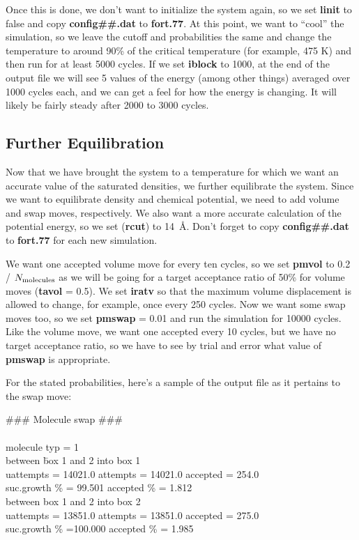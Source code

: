 \documentclass[12pt,letterpaper]{article}
\begin{document}
{{{{{{\noindent Once this is done, we don't want to initialize the system again, so we set
{\bf linit} to false and copy {\bf config\#\#.dat} to {\bf fort.77}.  At
this point, we want to ``cool'' the simulation, so we leave the cutoff
and probabilities the same and change the temperature to around 90\%
of the critical temperature (for example, 475 K) and then run for at least
5000 cycles.  If we set {\bf iblock} to 1000, at the end of the
output file we will see 5 values of the energy (among other things)
averaged over 1000 cycles each, and we can get a feel for how the energy is
changing.  It will likely be fairly steady after 2000 to 3000 cycles.

\subsection{Further Equilibration}

\noindent Now that we have brought the system to a temperature for which
we want an accurate value of the saturated densities, we further equilibrate the system.
Since we want to equilibrate density and chemical potential, we need to add volume and swap moves, respectively.  We also want a more accurate
calculation of the potential energy, so we set ({\bf rcut}) to
14~{\AA}.  Don't forget to copy {\bf config\#\#.dat} to {\bf fort.77} for each
new simulation.

\noindent We want one accepted volume move for every ten
cycles, so we set {\bf pmvol} to 0.2 / $N_{\rm molecules}$ as
we will be going for a target acceptance ratio of 50\% for volume
moves ({\bf tavol} = 0.5).  We set {\bf iratv} so that the maximum volume
displacement is allowed to change, for example, once every 250 cycles.  
Now we want some swap moves too, so we set {\bf pmswap} = 0.01 and run
the simulation for 10000 cycles.  Like the volume move, we want one
accepted every 10 cycles, but we have no target acceptance ratio, so
we have to see by trial and error what value of {\bf pmswap} is
appropriate.  

\noindent For the stated probabilities, here's a sample of the output
file as it pertains to the swap move:

{\bf
\begin{tabbing}
\#\#\# Molecule swap       \#\#\# \\
\\
 molecule typ =   \hskip 24pt        1 \\
between \= box  1 and  2 into box 1\\
   \> uattempts =    14021.0 attempts = 14021.0   accepted =   254.0\\
 suc.growth \% = 99.501   accepted \% =  1.812\\
between box  1 and  2 into box 2\\
   \>   uattempts =    13851.0 attempts = 13851.0   accepted =    275.0\\
 suc.growth \% =100.000   accepted \% =  1.985\\
\end{tabbing}
}

}}}}}}
\end{document}
